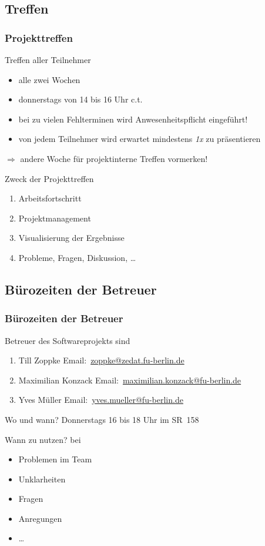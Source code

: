 \documentclass[ucs,9pt]{beamer}
\newcommand{\email}[1]{\href{mailto:#1}{#1}}
\begin{document}
\subsection{Treffen}
\begin{frame}
  \frametitle{Projekttreffen}
  \begin{block}{Treffen aller Teilnehmer}
    \begin{itemize}
      \item alle zwei Wochen
      \item donnerstags von 14 bis 16 Uhr c.t.
      \item bei zu vielen Fehlterminen wird Anwesenheitspflicht eingeführt!
      \item von jedem Teilnehmer wird erwartet mindestens \emph{1x} zu
          präsentieren
    \end{itemize}
  \end{block}
  $\Rightarrow$ andere Woche für projektinterne Treffen vormerken!

  \begin{block}{Zweck der Projekttreffen}
    \begin{enumerate}
        \item Arbeitsfortschritt
        \item Projektmanagement
        \item Visualisierung der Ergebnisse
        \item Probleme, Fragen, Diskussion, \dots
    \end{enumerate}
  \end{block}
\end{frame}

\subsection{Bürozeiten der Betreuer}
\begin{frame}
    \frametitle{Bürozeiten der Betreuer}
    Betreuer des Softwareprojekts sind
    \begin{enumerate}
        \item Till Zoppke Email:~\email{zoppke@zedat.fu-berlin.de}
        \item Maximilian Konzack Email:~\email{maximilian.konzack@fu-berlin.de}
        \item Yves Müller Email:~\email{yves.mueller@fu-berlin.de}
    \end{enumerate}
    \begin{block}{Wo und wann?}
        Donnerstags 16 bis 18 Uhr im SR~158
    \end{block}
    \begin{block}{Wann zu nutzen?}
        bei
        \begin{itemize}
            \item Problemen im Team
            \item Unklarheiten
            \item Fragen
            \item Anregungen
            \item \dots
        \end{itemize}
    \end{block}
\end{frame}
\end{document}
